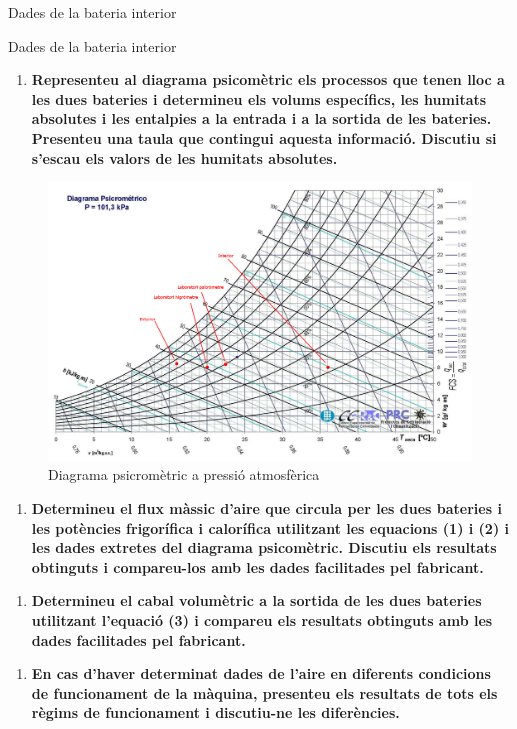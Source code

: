 \documentclass[a4paper]{article}
\newenvironment{questionenum}{%
	\setlist[enumerate]{resume}
	\restartlist{enumerate}
	\newcommand{\question}[1]{
		\begin{enumerate}
			\item\bfseries ##1
		\end{enumerate}
}}{%
}
\begin{document}
\begin{questionenum}
	\begin{table}[H]
		\begin{minipage}[t]{0.48\textwidth}
			\centering
			\caption{Dades de la bateria interior}
		\end{minipage}
		\begin{minipage}[t]{0.48\textwidth}
			\centering
			\caption{Dades de la bateria interior}
		\end{minipage}
	\end{table}

	\question{Representeu al diagrama psicomètric els processos que tenen lloc a les dues bateries i determineu els volums específics, les humitats absolutes i les entalpies a la entrada i a la sortida de les bateries. Presenteu una taula que contingui aquesta informació. Discutiu si s'escau els valors de les humitats absolutes.}
    
    \begin{figure}[H]
        \centering
        \includegraphics[width=\textwidth]{images/psychrometric}
        \caption{Diagrama psicromètric a pressió atmosfèrica}
    \end{figure}
	
	\question{Determineu el flux màssic d'aire que circula per les dues bateries i les potències frigorífica i calorífica utilitzant les equacions (1) i (2) i les dades extretes del diagrama psicomètric. Discutiu els resultats obtinguts i compareu-los amb les dades facilitades pel fabricant.}
	
	\question{Determineu el cabal volumètric a la sortida de les dues bateries utilitzant l'equació (3) i compareu els resultats obtinguts amb les dades facilitades pel fabricant.}
	
	\question{En cas d'haver determinat dades de l'aire en diferents condicions de funcionament de la màquina, presenteu els resultats de tots els règims de funcionament i discutiu-ne les diferències.}
\end{questionenum}
\end{document}
